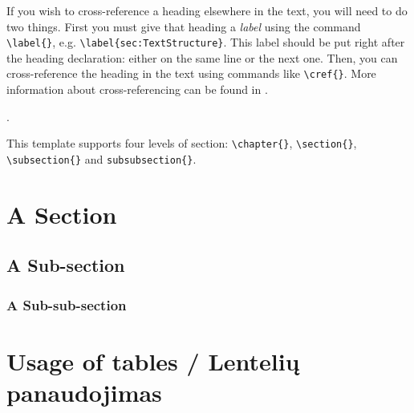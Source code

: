 If you wish to cross-reference a heading elsewhere in the text, you will need to do two things. 
First you must give that heading a \emph{label} using the command \verb|\label{}|, e.g. \verb|\label{sec:TextStructure}|. This label should be put right after the heading declaration: either on the same line or the next one.
Then, you can cross-reference the heading in the text using commands like \verb|\cref{}|.
More information about cross-referencing can be found in .


 \cite{demoABook, demoArticle}.

This template supports four levels of section: \verb|\chapter{}|,
\verb|\section{}|, \verb|\subsection{}| and \verb|subsubsection{}|.


\section{A Section} \label{sec:section}

\subsection{A Sub-section}  \label{subs:subsection}

\subsubsection{A Sub-sub-section}  \label{subs:subsubsection}


\section{Usage of tables / Lentelių panaudojimas}


